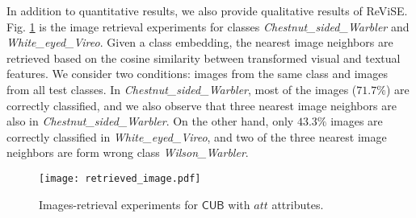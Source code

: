 {{In addition to quantitative results, we also provide qualitative results of ReViSE. Fig. \ref{fig:retr_image} is the image retrieval experiments
for classes {\em Chestnut\_sided\_Warbler} and {\em White\_eyed\_Vireo}. Given a class embedding, the nearest image neighbors are retrieved based on the cosine similarity between transformed visual and textual features. We consider two conditions: images from the same class and images from all test classes. In {\em Chestnut\_sided\_Warbler}, most of the images ($71.7\%$) are correctly classified, and we also observe that three nearest image neighbors are also in {\em Chestnut\_sided\_Warbler}. On the other hand, only $43.3\%$ images are correctly classified in {\em White\_eyed\_Vireo}, and two of the three nearest image neighbors are form wrong class {\em Wilson\_Warbler}.

 



\begin{figure}[t!]
\texttt{[image: retrieved\_image.pdf]}
\caption{\footnotesize Images-retrieval experiments for $\mathsf{CUB}$ with $\textit{att}$ attributes.}
\label{fig:retr_image}
\vspace{-0.1in}
\end{figure}



}}
